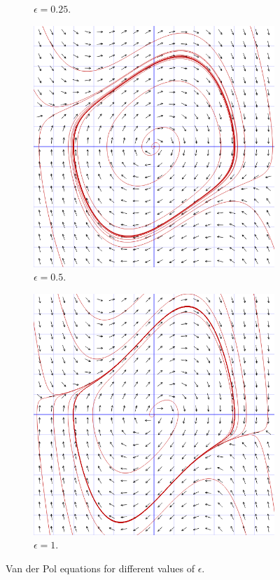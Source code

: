 \documentclass[11pt]{article}
\begin{document}
\begin{figure}[h]
\begin{subfigure}{0.24\textwidth}
                \caption{$\epsilon = 0.25$.}
        \end{subfigure}
        \begin{subfigure}{0.24\textwidth}
        \centering
                \includegraphics[width=0.95\linewidth]{vdp_0p5.png}
                \caption{$\epsilon = 0.5$.}
        \end{subfigure}
        \begin{subfigure}{0.24\textwidth}
        \centering
                \includegraphics[width=0.95\linewidth]{vdp_1.png}
                \caption{$\epsilon = 1$.}
        \end{subfigure}                        
        \caption{Van der Pol equations for different values of $\epsilon$.}
        \label{fig:vdp_variations}
\end{figure}
\end{document}
